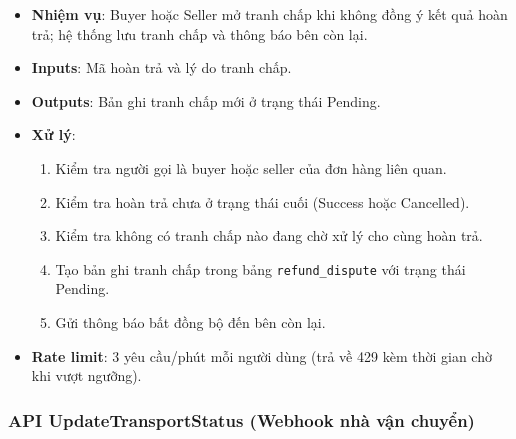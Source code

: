 \begin{itemize}[leftmargin=*]
  \item \textbf{Nhiệm vụ}: Buyer hoặc Seller mở tranh chấp khi không đồng ý kết quả hoàn trả; hệ thống lưu tranh chấp và thông báo bên còn lại.
  \item \textbf{Inputs}: Mã hoàn trả và lý do tranh chấp.
  \item \textbf{Outputs}: Bản ghi tranh chấp mới ở trạng thái Pending.
  \item \textbf{Xử lý}:
    \begin{enumerate}
      \item Kiểm tra người gọi là buyer hoặc seller của đơn hàng liên quan.
      \item Kiểm tra hoàn trả chưa ở trạng thái cuối (Success hoặc Cancelled).
      \item Kiểm tra không có tranh chấp nào đang chờ xử lý cho cùng hoàn trả.
      \item Tạo bản ghi tranh chấp trong bảng \texttt{refund\_dispute} với trạng thái Pending.
      \item Gửi thông báo bất đồng bộ đến bên còn lại.
    \end{enumerate}
  \item \textbf{Rate limit}: 3 yêu cầu/phút mỗi người dùng (trả về 429 kèm thời gian chờ khi vượt ngưỡng).
\end{itemize}

\subsubsection{API UpdateTransportStatus (Webhook nhà vận chuyển)}
\label{subsubsec:api-update-transport-status}

